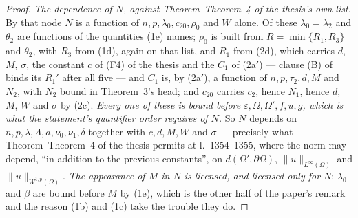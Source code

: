 \begin{proof}
\emph{The dependence of $N$, against Theorem~Theorem~4 of the thesis's own list.}  By that
node $N$ is a function of $n,p,\lambda_0,c_{20},\rho_0$ and $W$ alone.  Of these
$\lambda_0=\lambda_2$ and $\theta_2$ are functions of the quantities (1e) names;
$\rho_0$ is built from $R=\min\{R_1,R_3\}$ and $\theta_2$, with $R_3$ from (1d),
again on that list, and $R_1$ from (2d), which carries $d$, $M$, $\sigma$, the
constant $c$ of (F4) of the thesis and the $C_1$ of (2a$'$) --- clause (B) of
 binds its $R_1'$ after all five --- and
$C_1$ is, by (2a$'$), a function of $n,p,\tau_2,d,M$ and $N_2$, with $N_2$ bound
in Theorem~3's head; and $c_{20}$ carries $c_2$, hence $N_1$, hence $d$, $M$,
$W$ and $\sigma$ by (2c).  \emph{Every one of these is bound before
$\varepsilon,\Omega,\Omega',f,u,g$, which is what the statement's quantifier
order requires of $N$.}  So $N$ depends on
$n,p,\lambda,\Lambda,a,\nu_0,\nu_1,\delta$ together with $c,d,M,W$ and
$\sigma$ --- precisely what Theorem~Theorem~4 of the thesis permits at l.~1354--1355, where
the norm may depend, ``in addition to the previous constants'', on
$d(\Omega',\partial\Omega)$, $\|u\|_{L^\infty(\Omega)}$ and
$\|u\|_{W^{1,p}(\Omega)}$.  \emph{The appearance of $M$ in $N$ is licensed, and
licensed only for $N$}: $\lambda_0$ and $\beta$ are bound before $M$ by (1e),
which is the other half of the paper's remark and the reason (1b) and (1c) take
the trouble they do.


\end{proof}
